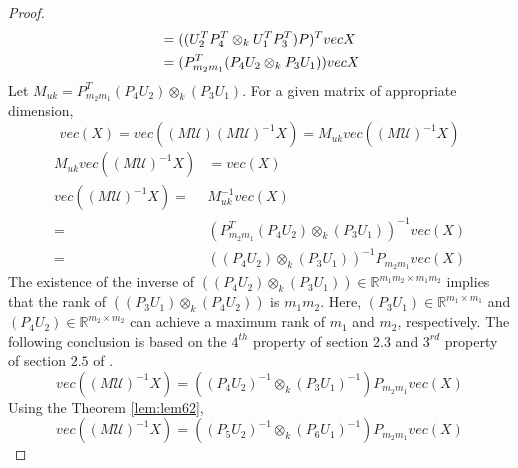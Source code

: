 \documentclass{article}
\begin{document}
\begin{proof}
\begin{equation}{\label{eq32}}
\begin{split}
             &=((U_2^TP_4^T \otimes_k U_1^TP_3^T)P)^TvecX\\
             &=(P_{m_2m_1}^T(P_4U_2 \otimes_k P_3U_1))vecX
\end{split}  
\end{equation}
Let $M_{uk} =P_{m_2m_1}^T(P_4U_2) \otimes_k (P_3U_1)$. For a given matrix of appropriate dimension,
\begin{equation*}
    vec(X)=vec((M\mathcal{U})(M\mathcal{U})^{-1}X)=M_{uk}vec((M\mathcal{U})^{-1}X)
\end{equation*}
\begin{equation*}\label{eq415}
    \begin{split}
        M_{uk}vec((M\mathcal{U})^{-1}X)&=vec(X)\\
        vec((M\mathcal{U})^{-1}X)=&M_{uk}^{-1}vec(X)\\
                       =&(P_{m_2m_1}^T(P_4U_2) \otimes_k (P_3U_1))^{-1}vec(X)\\
                       =&((P_4U_2) \otimes_k (P_3U_1))^{-1}P_{m_2m_1}vec(X)
    \end{split}
\end{equation*}
The existence of the inverse of $((P_4U_2) \otimes_k (P_3U_1)) \in \mathbb{R}^{m_1m_2 \times m_1m_2}$ implies that the rank of $((P_3U_1) \otimes_k (P_4U_2))$ is $m_1m_2$. Here, $(P_3U_1) \in \mathbb{R}^{m_1 \times m_1}$ and  $(P_4U_2) \in \mathbb{R}^{m_2 \times m_2}$ can achieve a maximum rank of $m_1$ and $m_2$, respectively. The following conclusion is based on the $4^{th}$ property of section $2.3$ and  $3^{rd}$ property of section $2.5$ of \cite{KronStat}.
\begin{equation*}
    vec((M\mathcal{U})^{-1}X)=((P_4U_2)^{-1} \otimes_k (P_3U_1)^{-1})P_{m_2m_1}vec(X)
\end{equation*}
Using the Theorem \ref{lem:lem62}, 
\begin{equation*}
    vec((M\mathcal{U})^{-1}X)=((P_5U_2)^{-1} \otimes_k (P_6U_1)^{-1})P_{m_2m_1}vec(X)
\end{equation*}
\end{proof}
\end{document}
